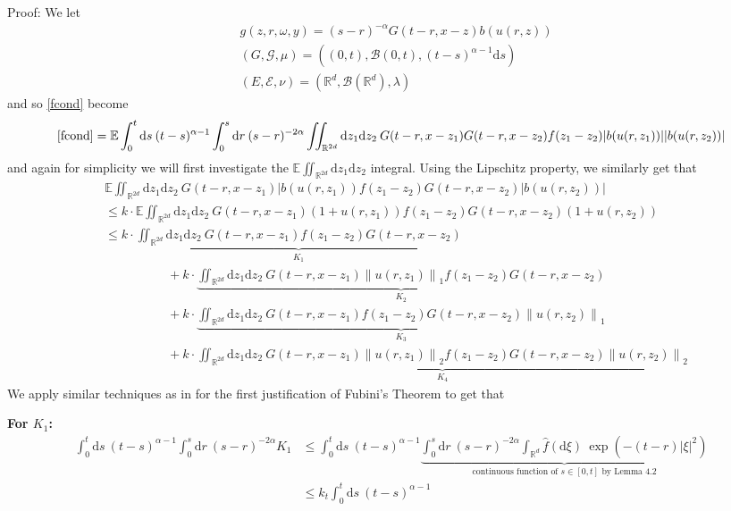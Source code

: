 \documentclass{article}
\numberwithin{equation}{section}
\newcommand{\R}{\mathbb{R}}
\newcommand{\E}{\mathbb{E}}
\newcommand{\Norm}[1]{\left\|  #1   \right\|}
\newcommand{\ud}{\ensuremath{\mathrm{d}}}
\begin{document}
Proof: We let 
\begin{align*}
&g(z,r,\omega,y)=(s-r)^{-\alpha}G(t-r,x-z)b(u(r,z))
\\& (G,\mathscr G, \mu)=((0,t),\mathscr B(0,t),(t-s)^{\alpha-1} \ud s)
\\& (E, \mathscr E, \nu) = (\R^d, \mathscr B(\R^d), \lambda)
\end{align*}
and so \eqref{fcond} become 
\begin{align*}
\eqref{fcond} = \E \int_0^t \ud s \: (t-s)^{\alpha-1}\int_0^s \ud r \: (s-r)^{-2\alpha} \iint_{\R^{2d}} \ud z_1 \ud z_2 \: G(t-r,x-z_1)G(t-r,x-z_2)f(z_1-z_2)|b(u(r,z_1))||b(u(r,z_2))|
\end{align*}
and again for simplicity we will first investigate the $\E\iint_{\R^{2d}}\ud z_1 \ud z_2$ integral. Using the Lipschitz property, we similarly get that 
\begin{align*}
&\E\iint_{\R^{2d}}\ud z_1 \ud z_2 \:G(t-r,x-z_1)|b(u(r,z_1))f(z_1-z_2)G(t-r,x-z_2)|b(u(r,z_2))| 
\\ & \le k\cdot  \E\iint_{\R^{2d}}\ud z_1 \ud z_2 \:G(t-r,x-z_1)(1+u(r,z_1))f(z_1-z_2)G(t-r,x-z_2)(1+u(r,z_2)) 
\\ &\le k\cdot \underbrace{\iint_{\R^{2d}}\ud z_1 \ud z_2 \:G(t-r,x-z_1)f(z_1-z_2)G(t-r,x-z_2)}_{K_1}
\\&\hspace{5em}+k\cdot \underbrace{\iint_{\R^{2d}}\ud z_1 \ud z_2 \:G(t-r,x-z_1)\Norm{u(r,z_1)}_1f(z_1-z_2)G(t-r,x-z_2)}_{K_2} 
\\&\hspace{5em}+ k\cdot \underbrace{\iint_{\R^{2d}}\ud z_1 \ud z_2 \:G(t-r,x-z_1)f(z_1-z_2)G(t-r,x-z_2)\Norm{u(r,z_2)}_1}_{K_3}
\\& \hspace{5em}+ k\cdot \underbrace{\iint_{\R^{2d}}\ud z_1 \ud z_2 \:G(t-r,x-z_1)\Norm{u(r,z_1)}_2f(z_1-z_2)G(t-r,x-z_2)\Norm{u(r,z_2)}_2}_{K_4} 
\end{align*}
We apply similar techniques as in for the first justification of Fubini's Theorem to get that 

\noindent \textbf{For $K_1$:}
\begin{align*}
\int_0^t \ud s \: (t-s)^{\alpha-1}\int_0^s \ud r \: (s-r)^{-2\alpha} K_1 &\le \int_0^t \ud s \: (t-s)^{\alpha-1}\underbrace{\int_0^s \ud r \: (s-r)^{-2\alpha} 
	\int_{\R^d}\hat f(\ud \xi)\: \exp\left(-(t-r)|\xi|^2\right)}_{\text{continuous function of $s \in [0,t]$ by Lemma 4.2}}
\\& \le k_t\int_0^t \ud s \: (t-s)^{\alpha-1} 
\end{align*}
\end{document}
